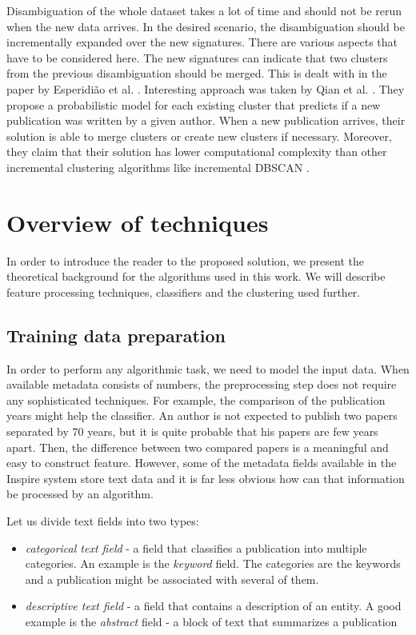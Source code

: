 \documentclass{pracamgr}
\begin{document}
Disambiguation of the whole dataset takes a lot of time and should not 
be rerun when the new data arrives. In the desired scenario, the disambiguation should be 
incrementally expanded over the new signatures. There are various aspects that have to be 
considered here. The new signatures can indicate that two clusters from the previous 
disambiguation should be merged. This is dealt with in the paper by Esperidi{\~a}o et al. 
\citep{Esperidiao}. Interesting approach was taken by Qian et al. \citep{qian2015dynamic}.
They propose a probabilistic model for each existing cluster that predicts if a new
publication was written by a given author. When a new publication arrives, their solution is
able to merge clusters or create new clusters if necessary. Moreover, they claim that their
solution has lower computational complexity than other incremental clustering algorithms like
incremental DBSCAN \citep{ester1998incremental}.


\chapter{Overview of techniques}


In order to introduce the reader to the proposed solution, we present the theoretical background
for the algorithms used in this work.
We will describe feature processing techniques, classifiers and the clustering used further.

\section{Training data preparation}

In order to perform any algorithmic task, we need to model the input data. When available
metadata consists of numbers, the preprocessing step does not require any sophisticated
techniques. For example, the comparison of the publication years might help the
classifier. An author is not expected to publish two papers separated by 70 years, but it is
quite probable that his papers are few years apart. Then, the
difference between two compared papers is a meaningful and easy to construct feature.
However, some of the metadata fields available in the Inspire system store text data and
it is far less obvious how can that information be processed by an algorithm.

Let us divide text fields into two types:

\begin{itemize}

\item{\textit{categorical text field} - a field that classifies a publication into multiple
categories. An example is the \textit{keyword} field. The categories are the keywords and a
publication might be associated with several of them.}

\item{\textit{descriptive text field} - a field that contains a description of an entity. A good
example is the \textit{abstract} field - a block of text that summarizes a publication}

\end{itemize}
\end{document}
